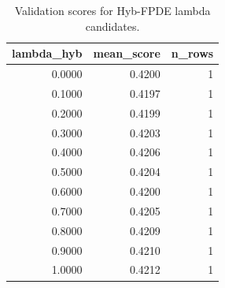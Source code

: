 \begin{table}[t]
\caption{Validation scores for Hyb-FPDE lambda candidates.}
\label{tab:lambda_distribution_computed}
\centering
\begin{tabular}{rrr}
\toprule
lambda\_hyb & mean\_score & n\_rows \\
\midrule
0.0000 & 0.4200 & 1 \\
0.1000 & 0.4197 & 1 \\
0.2000 & 0.4199 & 1 \\
0.3000 & 0.4203 & 1 \\
0.4000 & 0.4206 & 1 \\
0.5000 & 0.4204 & 1 \\
0.6000 & 0.4200 & 1 \\
0.7000 & 0.4205 & 1 \\
0.8000 & 0.4209 & 1 \\
0.9000 & 0.4210 & 1 \\
1.0000 & 0.4212 & 1 \\
\bottomrule
\end{tabular}

\end{table}
